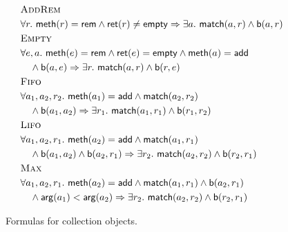 \begin{figure}
  \footnotesize
  \begin{align*}
    & \textsc{AddRem} \\
    & \forall r.\ {\sf meth}(r) = {\sf rem} \land {\sf ret}(r) \neq {\sf empty} \implies
      \exists a.\ {\sf match}(a,r) \land {\sf b}(a,r)
    \\
    & \textsc{Empty} \\
    & \forall e, a.\ {\sf meth}(e) = {\sf rem} \land {\sf ret}(e) = {\sf empty} \land {\sf meth}(a) = {\sf add} \\
    & \quad \land {\sf b}(a,e) \implies \exists r.\ {\sf match}(a,r) \land {\sf b}(r,e)
    \\
    & \textsc{Fifo} \\
    & \forall a_1, a_2, r_2.\ {\sf meth}(a_1) = {\sf add} \land {\sf match}(a_2,r_2) \\
    & \quad \land {\sf b}(a_1,a_2) \implies \exists r_1.\ {\sf match}(a_1,r_1) \land {\sf b}(r_1,r_2)
    \\
    & \textsc{Lifo} \\
    & \forall a_1, a_2, r_1.\ {\sf meth}(a_2) = {\sf add} \land {\sf match}(a_1,r_1) \\
    & \quad \land {\sf b}(a_1,a_2) \land {\sf b}(a_2,r_1) \implies \exists r_2.\ {\sf match}(a_2,r_2) \land {\sf b}(r_2,r_1)
    \\
    & \textsc{Max} \\
    & \forall a_1, a_2, r_1.\ {\sf meth}(a_2) = {\sf add} \land {\sf match}(a_1,r_1) \land {\sf b}(a_2,r_1) \\
    & \quad \land {\sf arg}(a_1) < {\sf arg}(a_2) \implies \exists r_2.\ {\sf match}(a_2,r_2) \land {\sf b}(r_2,r_1)
  \end{align*}
  \caption{Formulas for collection objects.}
  \label{fig:formulas:collecions}
\end{figure}

